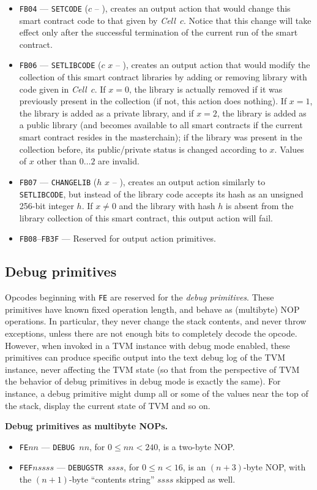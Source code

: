\documentclass[12pt,oneside]{article}
\def\makepoint#1{\medbreak\noindent{\bf #1.\ }}
\def\nxsubpoint{\refstepcounter{subsubsection}%
  \smallbreak\makepoint{\thesubsubsection}}
\def\emb#1{\textbf{#1.}}
\def\mysubsection#1{\subsection{#1}\fancyhead[C]{\small{\textsc{\textrm{\thesubsection.} #1}}}}
\begin{document}
\begin{itemize}
\item {\tt FB04} --- {\tt SETCODE} ($c$ -- ), creates an output action that would change this smart contract code to that given by {\em Cell\/}~$c$. Notice that this change will take effect only after the successful termination of the current run of the smart contract.
\item {\tt FB06} --- {\tt SETLIBCODE} ($c$ $x$ -- ), creates an output action that would modify the collection of this smart contract libraries by adding or removing library with code given in {\em Cell\/}~$c$. If $x=0$, the library is actually removed if it was previously present in the collection (if not, this action does nothing). If $x=1$, the library is added as a private library, and if $x=2$, the library is added as a public library (and becomes available to all smart contracts if the current smart contract resides in the masterchain); if the library was present in the collection before, its public/private status is changed according to $x$. Values of $x$ other than $0\ldots 2$ are invalid.
\item {\tt FB07} --- {\tt CHANGELIB} ($h$ $x$ -- ), creates an output action similarly to {\tt SETLIBCODE}, but instead of the library code accepts its hash as an unsigned 256-bit integer $h$. If $x\neq0$ and the library with hash $h$ is absent from the library collection of this smart contract, this output action will fail.
\item {\tt FB08}--{\tt FB3F} --- Reserved for output action primitives.
\end{itemize}

\mysubsection{Debug primitives}\label{p:prim.debug}
Opcodes beginning with {\tt FE} are reserved for the {\em debug primitives}. These primitives have known fixed operation length, and behave as (multibyte) NOP operations. In particular, they never change the stack contents, and never throw exceptions, unless there are not enough bits to completely decode the opcode. However, when invoked in a TVM instance with debug mode enabled, these primitives can produce specific output into the text debug log of the TVM instance, never affecting the TVM state (so that from the perspective of TVM the behavior of debug primitives in debug mode is exactly the same). For instance, a debug primitive might dump all or some of the values near the top of the stack, display the current state of TVM and so on.

\nxsubpoint\emb{Debug primitives as multibyte NOPs}
\begin{itemize}
\item {\tt FE$nn$} --- {\tt DEBUG $nn$}, for $0\leq nn<240$, is a two-byte NOP.
\item {\tt FEF$nssss$} --- {\tt DEBUGSTR $ssss$}, for $0\leq n<16$, is an $(n+3)$-byte NOP, with the $(n+1)$-byte ``contents string'' $ssss$ skipped as well.
\end{itemize}
\end{document}
